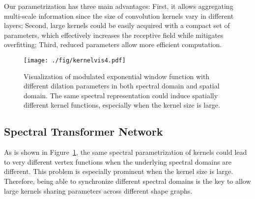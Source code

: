 \documentclass[10pt,twocolumn,letterpaper]{article}
\newcommand{\cmt}[2]{[#1: #2]}
\newcommand{\todo}[1]{\cmt{{\bf TODO}}{{\bf \color{blue} #1}}}
\begin{document}
Our parametrization has three main advantages: First, it allows aggregating multi-scale information since the size of convolution kernels vary in different layers; Second, large kernels could be easily acquired with a compact set of parameters, which effectively increases the receptive field while mitigates overfitting; Third, reduced parameters allow more efficient computation.
\iffalse
\todo{
\begin{itemize}
  \item We use modulated exponential window to parametrize our convolution kernel in the spectral domain. 
  \item Observing that the spacial support of these kernels increase with a shrink of the exponential window width, we adapt exponential window with different width in different layers of the network. This allows the network to capture information at different spatial scales.
  \item We use cos/sin function to modulate the exponential window, which increases the expressive power of the kernel without increasing its spatial support much. 
\end{itemize}
}
\fi

\vspace{-0.1cm}
\begin{figure}
    \centering
    \texttt{[image: ./fig/kernelvis4.pdf]}
    \caption{Visualization of modulated exponential window function with different dilation parameters in both spectral domain and spatial domain. The same spectral representation could induce spatially different kernel functions, especially when the kernel size is large.}
    \label{fig:kernelvis}
    \vspace{-0.3cm}
\end{figure}

\subsection{Spectral Transformer Network}
\label{spectn}
As is shown in Figure~\ref{fig:kernelvis}, the same spectral parametrization of kernels could lead to very different vertex functions when the underlying spectral domains are different. This problem is especially prominent when the kernel size is large. Therefore, being able to synchronize different spectral domains is the key to allow large kernels sharing parameters across different shape graphs. 
\end{document}
